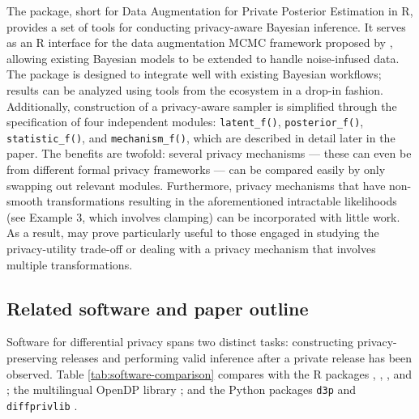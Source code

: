 The  package, short for Data Augmentation for Private Posterior Estimation in R, provides a set of tools for conducting
privacy-aware Bayesian inference. It serves as an R
interface for the data augmentation MCMC framework proposed by \citet{Ju2022},
allowing existing Bayesian models to be extended to handle
noise-infused data. The package is designed to integrate well with existing Bayesian workflows;
results can be analyzed using tools from the  \citep{rstan_pkg} ecosystem in a drop-in fashion. Additionally,
construction of a privacy-aware sampler is simplified
through the specification of four independent modules: \texttt{latent\_f()}, \texttt{posterior\_f()}, \texttt{statistic\_f()},
and \texttt{mechanism\_f()}, which are described in detail later in the paper.
The benefits are twofold: several privacy mechanisms --- these can even be from different formal privacy frameworks ---
can be compared easily by only swapping out relevant modules. Furthermore, privacy mechanisms
that have non-smooth transformations resulting in the aforementioned intractable likelihoods
(see Example 3, which involves clamping) can be incorporated with little work. As a result,
 may prove particularly useful to those engaged in studying the privacy-utility trade-off or dealing with a privacy mechanism that involves multiple transformations.

\subsection{Related software and paper outline}\label{sec:related-software}

Software for differential privacy spans two distinct tasks: constructing
privacy-preserving releases and performing valid inference after a private
release has been observed. Table \ref{tab:software-comparison} compares
 with the R packages  \citep{tidydp_pkg},
 \citep{DPpack_pkg},  \citep{diffpriv_pkg}, and
 \citep{SimBaRepro_pkg}; the multilingual OpenDP library
\citep{opendp_pkg}; and the Python packages \texttt{d3p} \citep{d3p_pkg} and \texttt{diffprivlib}
\citep{diffprivlib_pkg}.

